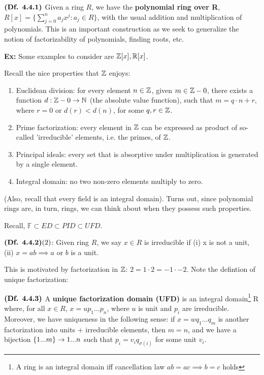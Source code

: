 \documentclass{article}
\begin{document}
$\textbf{(Df. 4.4.1)}$ Given a ring $R$, we have the \textbf{polynomial ring over R}, $R[x] = \{\sum_{j=0}^n a_jx^j: a_j \in R\}$, with the usual addition and multiplication of polynomials. This is an important construction as we seek to generalize the notion of factorizability of polynomials, finding roots, etc.

\textbf{Ex:} Some examples to consider are $\mathbb{Z}[x], \mathbb{R}[x]$.

Recall the nice properties that $\mathbb{Z}$ enjoys:

\begin{enumerate}
    \item Euclidean division: for every element $n \in \mathbb{Z}$, given $m \in \mathbb{Z} - 0$, there exists a function $d:\mathbb{Z} - 0 \rightarrow \mathbb{N}$ (the absolute value function), such that $m = q \cdot n + r$, where $r = 0$ or $d(r) < d(n)$, for some $q, r \in \mathbb{Z}$.
    
    \item Prime factorization: every element in $\mathbb{Z}$ can be expressed as product of so-called 'irreducible' elements, i.e. the primes, of $\mathbb{Z}$.
    
    \item Principal ideals: every set that is absorptive under multiplication is generated by a single element.

    \item Integral domain: no two non-zero elements multiply to zero.
\end{enumerate}

(Also, recall that every field is an integral domain). Turns out, since polynomial rings are, in turn, rings, we can think about when they possess such properties.

Recall, $\mathbb{F} \subset ED \subset PID \subset UFD$.

$\textbf{(Df. 4.4.2)} (2)$: Given ring $R$, we say $x \in R$ is irreducible if (i) x is not a unit, (ii) $x = ab \implies a$ or $b$ is a unit.

This is motivated by factorization in $\mathbb{Z}$: $2 = 1 \cdot 2 = -1 \cdot -2$. Note the defintion of unique factorization:

$\textbf{(Df. 4.4.3)}$ A \textbf{unique factorization domain (UFD)} is an integral domain\footnote{A ring is an integral domain iff cancellation law $ab = ac \implies b = c$ holds} R where, for all $x \in R$, $x = u p_1 ... p_n$, where $u$ is unit and $p_i$ are irreducible. 
Moreover, we have uniqueness in the following sense: if $x = w q_1...q_m$ is another factorization into units + irreducible elements, then $m = n$, and we have a bijection $\{1...m\} \rightarrow {1...n}$ such that $p_i = v_i q_{\sigma(i)}$ for some unit $v_i$. 
\end{document}
